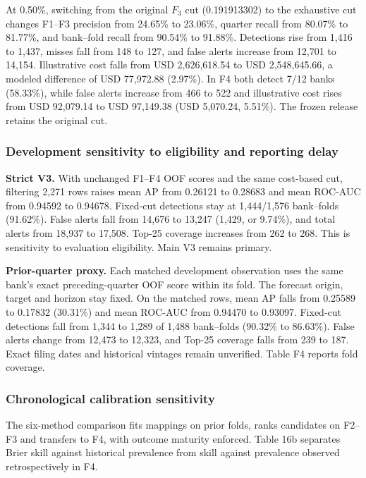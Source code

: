 \documentclass[
  12pt,
  a4paper,
]{article}
\begin{document}
At 0.50\%, switching from the original \(F_3\) cut (0.191913302) to the
exhaustive cut changes F1--F3 precision from 24.65\% to 23.06\%, quarter
recall from 80.07\% to 81.77\%, and bank--fold recall from 90.54\% to
91.88\%. Detections rise from 1,416 to 1,437, misses fall from 148 to
127, and false alerts increase from 12,701 to 14,154. Illustrative cost
falls from USD 2,626,618.54 to USD 2,548,645.66, a modeled difference of
USD 77,972.88 (2.97\%). In F4 both detect 7/12 banks (58.33\%), while
false alerts increase from 466 to 522 and illustrative cost rises from
USD 92,079.14 to USD 97,149.38 (USD 5,070.24, 5.51\%). The frozen
release retains the original cut.

\subsubsection{Development sensitivity to eligibility and reporting
delay}\label{development-sensitivity-to-eligibility-and-reporting-delay}

\textbf{Strict V3.} With unchanged F1--F4 OOF scores and the same
cost-based cut, filtering 2,271 rows raises mean AP from 0.26121 to
0.28683 and mean ROC-AUC from 0.94592 to 0.94678. Fixed-cut detections
stay at 1,444/1,576 bank--folds (91.62\%). False alerts fall from 14,676
to 13,247 (1,429, or 9.74\%), and total alerts from 18,937 to 17,508.
Top-25 coverage increases from 262 to 268. This is sensitivity to
evaluation eligibility. Main V3 remains primary.

\textbf{Prior-quarter proxy.} Each matched development observation uses
the same bank's exact preceding-quarter OOF score within its fold. The
forecast origin, target and horizon stay fixed. On the matched rows,
mean AP falls from 0.25589 to 0.17832 (30.31\%) and mean ROC-AUC from
0.94470 to 0.93097. Fixed-cut detections fall from 1,344 to 1,289 of
1,488 bank--folds (90.32\% to 86.63\%). False alerts change from 12,473
to 12,323, and Top-25 coverage falls from 239 to 187. Exact filing dates
and historical vintages remain unverified. Table F4 reports fold
coverage.

\subsubsection{Chronological calibration
sensitivity}\label{chronological-calibration-sensitivity}

The six-method comparison fits mappings on prior folds, ranks candidates
on F2--F3 and transfers to F4, with outcome maturity enforced. Table 16b
separates Brier skill against historical prevalence from skill against
prevalence observed retrospectively in F4.
\end{document}
